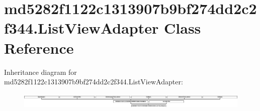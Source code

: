 \hypertarget{classmd5282f1122c1313907b9bf274dd2c2f344_1_1ListViewAdapter}{}\section{md5282f1122c1313907b9bf274dd2c2f344.\+List\+View\+Adapter Class Reference}
\label{classmd5282f1122c1313907b9bf274dd2c2f344_1_1ListViewAdapter}
Inheritance diagram for md5282f1122c1313907b9bf274dd2c2f344.\+List\+View\+Adapter\+:\begin{figure}[H]
\begin{center}
\leavevmode
\includegraphics[height=0.790960cm]{classmd5282f1122c1313907b9bf274dd2c2f344_1_1ListViewAdapter}
\end{center}
\end{figure}

